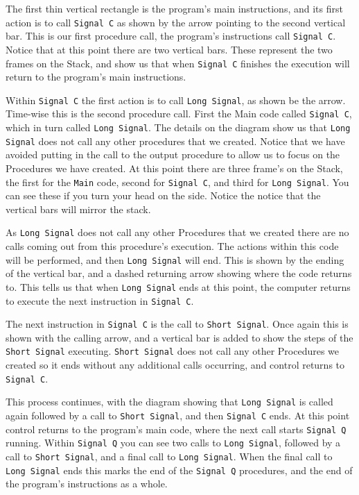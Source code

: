 The first thin vertical rectangle is the program's main instructions, and its first action is to call \texttt{Signal C} as shown by the arrow pointing to the second vertical bar. This is our first procedure call, the program's instructions call \texttt{Signal C}. Notice that at this point there are two vertical bars. These represent the two frames on the Stack, and show us that when \texttt{Signal C} finishes the execution will return to the program's main instructions.

Within \texttt{Signal C} the first action is to call \texttt{Long Signal}, as shown be the arrow. Time-wise this is the second procedure call. First the Main code called \texttt{Signal C}, which in turn called \texttt{Long Signal}. The details on the diagram show us that \texttt{Long Signal} does not call any other procedures that we created. Notice that we have avoided putting in the call to the output procedure to allow us to focus on the Procedures we have created. At this point there are three frame's on the Stack, the first for the \texttt{Main} code, second for \texttt{Signal C}, and third for \texttt{Long Signal}. You can see these if you turn your head on the side. Notice the notice that the vertical bars will mirror the stack.

As \texttt{Long Signal} does not call any other Procedures that we created there are no calls coming out from this procedure's execution. The actions within this code will be performed, and then \texttt{Long Signal} will end. This is shown by the ending of the vertical bar, and a dashed returning arrow showing where the code returns to. This tells us that when \texttt{Long Signal} ends at this point, the computer returns to execute the next instruction in \texttt{Signal C}.

The next instruction in \texttt{Signal C} is the call to \texttt{Short Signal}. Once again this is shown with the calling arrow, and a vertical bar is added to show the steps of the \texttt{Short Signal} executing. \texttt{Short Signal} does not call any other Procedures we created so it ends without any additional calls occurring, and control returns to \texttt{Signal C}.

This process continues, with the diagram showing that \texttt{Long Signal} is called again followed by a call to \texttt{Short Signal}, and then \texttt{Signal C} ends. At this point control returns to the program's main code, where the next call starts \texttt{Signal Q} running. Within \texttt{Signal Q} you can see two calls to \texttt{Long Signal}, followed by a call to \texttt{Short Signal}, and a final call to \texttt{Long Signal}. When the final call to \texttt{Long Signal} ends this marks the end of the \texttt{Signal Q} procedures, and the end of the program's instructions as a whole.

